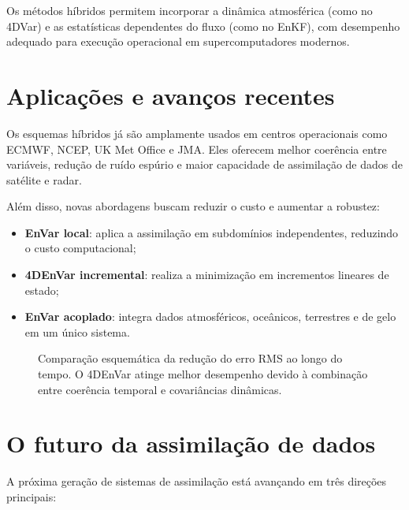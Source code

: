 Os métodos híbridos permitem incorporar a dinâmica atmosférica (como no 4DVar) e as estatísticas dependentes do fluxo (como no EnKF), com desempenho adequado para execução operacional em supercomputadores modernos.

\section{Aplicações e avanços recentes}
Os esquemas híbridos já são amplamente usados em centros operacionais como ECMWF, NCEP, UK Met Office e JMA.  
Eles oferecem melhor coerência entre variáveis, redução de ruído espúrio e maior capacidade de assimilação de dados de satélite e radar.

Além disso, novas abordagens buscam reduzir o custo e aumentar a robustez:
\begin{itemize}
  \item \textbf{EnVar local}: aplica a assimilação em subdomínios independentes, reduzindo o custo computacional;
  \item \textbf{4DEnVar incremental}: realiza a minimização em incrementos lineares de estado;
  \item \textbf{EnVar acoplado}: integra dados atmosféricos, oceânicos, terrestres e de gelo em um único sistema.
\end{itemize}

\begin{figure}[h!]
\centering
{}
\caption{Comparação esquemática da redução do erro RMS ao longo do tempo. O 4DEnVar atinge melhor desempenho devido à combinação entre coerência temporal e covariâncias dinâmicas.}
\label{fig:rms-comparison}
\end{figure}

\section{O futuro da assimilação de dados}
A próxima geração de sistemas de assimilação está avançando em três direções principais:

